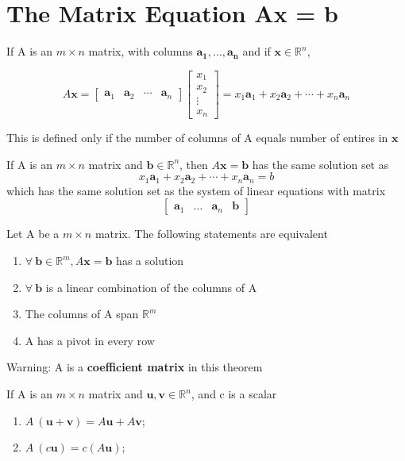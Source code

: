 \documentclass{report}
\begin{document}
\section{The Matrix Equation Ax = b}
\begin{definition}
\end{definition}
If A is an $m \times n$ matrix, with columns $\mathbf{a_1}, \ldots, \mathbf{a_n}$ and if $\mathbf{x} \in \mathbb{R}^n$,

\[
A \mathbf{x} =
\begin{bmatrix}
\mathbf{a}_1 & \mathbf{a}_2 & \cdots & \mathbf{a}_n
\end{bmatrix}
\begin{bmatrix}
x_1 \\ x_2 \\ \vdots \\ x_n
\end{bmatrix}
= x_1 \mathbf{a}_1 + x_2 \mathbf{a}_2 + \cdots + x_n \mathbf{a}_n
\]

This is defined only if the number of columns of A equals number of entires in $\mathbf{x}$

\begin{theorem}
\end{theorem}
If A is an $m \times n$ matrix and $\mathbf{b} \in \mathbb{R}^n$, then $A \mathbf{x} = \mathbf{b}$ has the same solution set as
\[
x_1 \mathbf{a}_1 + x_2 \mathbf{a}_2 + \cdots + x_n \mathbf{a}_n = b
\]
which has the same solution set as the system of linear equations with matrix
\[
\begin{bmatrix}
    \mathbf{a}_1 & \ldots & \mathbf{a}_n & \mathbf{b}
\end{bmatrix}
\]

\begin{theorem}
\end{theorem}
Let A be a $m \times n$ matrix. The following statements are equivalent
\begin{enumerate}[label=\alph*.]
    \item $\forall\ \mathbf{b} \in \mathbb{R}^m, A \mathbf{x} = \mathbf{b}$ has a solution
    \item $\forall\ \mathbf{b}$ is a linear combination of the columns of A
    \item The columns of A span $\mathbb{R}^m$
    \item A has a pivot in every row
\end{enumerate}
Warning: A is a \textbf{coefficient matrix} in this theorem

\begin{theorem}
\end{theorem}
If A is an $m \times n$ matrix and $\mathbf{u},\mathbf{v} \in \mathbb{R}^n$, and c is a scalar
\begin{enumerate}[label=\alph*.]
    \item $A\ (\mathbf{u} + \mathbf{v}) = A \mathbf{u} + A \mathbf{v}$;
    \item $A\ (c \mathbf{u}) = c (A \mathbf{u})$;
\end{enumerate}
\end{document}
